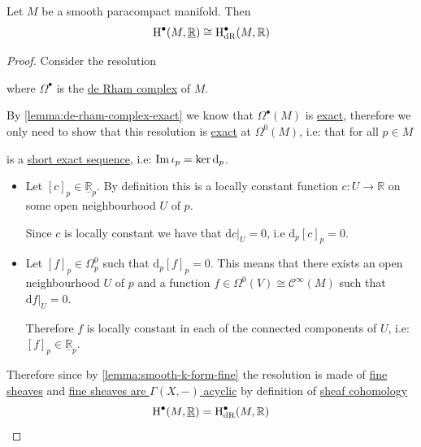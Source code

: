 \documentclass[../../main]{subfiles}
\begin{document}
\begin{theorem}
  Let \(M\) be a smooth paracompact manifold.
  Then
  \begin{equation*}
     \operatorname{H}^{\bullet}(M, \underline{\mathbb{R}}) \cong \operatorname{H}^{\bullet}_{\operatorname{dR}}(M, \mathbb{R})
  \end{equation*}
\end{theorem}
\begin{proof}
  Consider the resolution
  \begin{center}
  \end{center}
  where \(\Omega^{\bullet}\) is the \hyperref[def:de-rham-complex]{de Rham complex} of \(M\).

  By \autoref{lemma:de-rham-complex-exact} we know that \(\Omega^{\bullet}(M)\) is \hyperref[def:exact-complex]{exact}, therefore we only need to show that this resolution is \hyperref[def:exact-complex]{exact} at \(\Omega^{0}(M)\), i.e: that for all \(p \in M\)
  \begin{center}
  \end{center}
  is a \hyperref[def:short-exact-sequence]{short exact sequence}, i.e: \(\operatorname*{Im} \iota_{p} = \ker \mathrm{d}_{p}\).

  \begin{itemize}
    \item[\(\subseteq\)] Let \([c]_{p} \in \underline{\mathbb{R}}_{p}\). By definition this is a locally constant function \(c: U \to \mathbb{R}\) on some open neighbourhood \(U\) of \(p\).

          Since \(c\) is locally constant we have that \(\mathrm{d}c|_{U} = 0\), i.e \(\mathrm{d}_{p}[c]_{p} = 0\).
    \item[\(\supseteq\)] Let \([f]_{p} \in \Omega_{p}^{0}\) such that \(\mathrm{d}_{p}[f]_{p} = 0\).
          This means that there exists an open neighbourhood \(U\) of \(p\) and a function \(f \in \Omega^{0}(V) \cong \mathcal{C}^{\infty}(M)\) such that \(\mathrm{d}f|_{U} = 0\).

          Therefore \(f\) is locally constant in each of the connected components of \(U\), i.e: \([f]_{p} \in \underline{\mathbb{R}}_{p}\).
  \end{itemize}

  Therefore since by \autoref{lemma:smooth-k-form-fine} the resolution is made of \hyperref[def:fine-sheaf]{fine sheaves} and \hyperref[prop:fine-are-acyclic]{fine sheaves are \(\Gamma(X, -)\) acyclic} by definition of \hyperref[def:sheaf-cohomology]{sheaf cohomology}
  \begin{equation*}
      \operatorname{H}^{\bullet}(M, \underline{\mathbb{R}}) = \operatorname{H}^{\bullet}_{\operatorname{dR}}(M, \mathbb{R}) \qedhere
  \end{equation*}
\end{proof}
\end{document}
